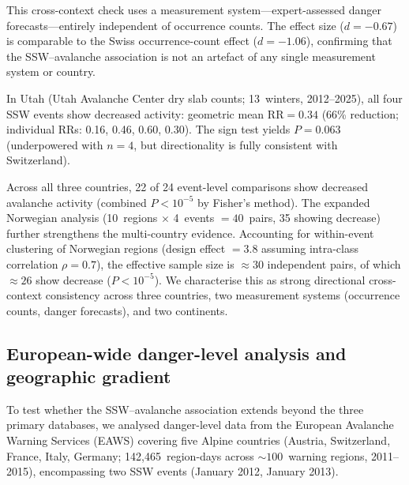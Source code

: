 \documentclass[11pt,letterpaper]{article}
\begin{document}
This cross-context check uses a measurement system---expert-assessed danger forecasts---entirely independent of occurrence counts. The effect size ($d = -0.67$) is comparable to the Swiss occurrence-count effect ($d = -1.06$), confirming that the SSW--avalanche association is not an artefact of any single measurement system or country.

In Utah (Utah Avalanche Center dry slab counts; 13~winters, 2012--2025), all four SSW events show decreased activity: geometric mean $\mathrm{RR} = 0.34$ (66\% reduction; individual RRs: 0.16, 0.46, 0.60, 0.30). The sign test yields $P = 0.063$ (underpowered with $n = 4$, but directionality is fully consistent with Switzerland).

Across all three countries, 22 of 24 event-level comparisons show decreased avalanche activity (combined $P < 10^{-5}$ by Fisher's method). The expanded Norwegian analysis (10~regions $\times$ 4~events $= 40$~pairs, 35 showing decrease) further strengthens the multi-country evidence. Accounting for within-event clustering of Norwegian regions (design effect $= 3.8$ assuming intra-class correlation $\rho = 0.7$), the effective sample size is $\approx 30$ independent pairs, of which $\approx 26$ show decrease ($P < 10^{-5}$). We characterise this as strong directional cross-context consistency across three countries, two measurement systems (occurrence counts, danger forecasts), and two continents.

\subsection*{European-wide danger-level analysis and geographic gradient}

To test whether the SSW--avalanche association extends beyond the three primary databases, we analysed danger-level data from the European Avalanche Warning Services (EAWS) covering five Alpine countries (Austria, Switzerland, France, Italy, Germany; 142,465~region-days across ${\sim}100$~warning regions, 2011--2015), encompassing two SSW events (January 2012, January 2013).
\end{document}
